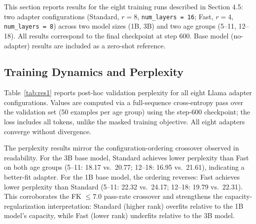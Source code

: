 \documentclass[AMA,Times1COL]{WileyNJDv5} %
\begin{document}
This section reports results for the eight training runs described in Section 4.5: two adapter configurations (Standard, $r = 8$, \texttt{num\_layers = 16}; Fast, $r = 4$, \texttt{num\_layers = 8}) across two model sizes (1B, 3B) and two age groups (5--11, 12--18). All results correspond to the final checkpoint at step 600. Base model (no-adapter) results are included as a zero-shot reference.

\subsection{Training Dynamics and Perplexity}

Table~\ref{tab:res1} reports post-hoc validation perplexity for all eight Llama adapter configurations. Values are computed via a full-sequence cross-entropy pass over the validation set (50 examples per age group) using the step-600 checkpoint; the loss includes all tokens, unlike the masked training objective. All eight adapters converge without divergence.

The perplexity results mirror the configuration-ordering crossover observed in readability. For the 3B base model, Standard achieves lower perplexity than Fast on both age groups (5--11: 18.17 vs.\ 20.77; 12--18: 16.95 vs.\ 21.61), indicating a better-fit adapter. For the 1B base model, the ordering reverses: Fast achieves lower perplexity than Standard (5--11: 22.32 vs.\ 24.17; 12--18: 19.79 vs.\ 22.31). This corroborates the FK $\leq 7.0$ pass-rate crossover and strengthens the capacity-regularization interpretation: Standard (higher rank) overfits relative to the 1B model's capacity, while Fast (lower rank) underfits relative to the 3B model.
\end{document}
